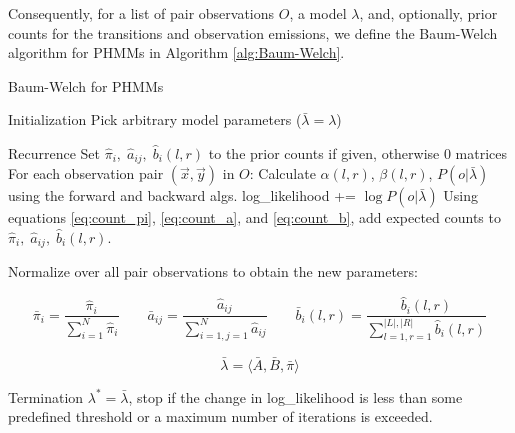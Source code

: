 \documentclass[a4paper,10pt]{article}
\begin{document}
Consequently, for a list of pair observations $O$, a model $\lambda$, and,
optionally, prior counts for the transitions and observation emissions, we
define the Baum-Welch algorithm for PHMMs in Algorithm \ref{alg:Baum-Welch}.

\vspace{0.4cm}
\begin{algorithm}[H]
\caption{Baum-Welch for PHMMs}
  \DontPrintSemicolon
{}
\BlankLine
{}
\BlankLine

Initialization\;
\BlankLine
\Indp Pick arbitrary model parameters ($\bar \lambda = \lambda$)\;
\BlankLine

\Indm Recurrence\;\Indp
\BlankLine
Set $\hat \pi_i,\; \hat a_{ij},\; \hat b_i(l, r)$ to the prior counts if given,
otherwise 0 matrices\;
For each observation pair $(\vec{x}, \vec{y})$ in $O$:\;\Indp
Calculate $\alpha(l,r)$, $\beta(l,r)$, $P(o | \bar\lambda)$ using the forward
and backward algs.\;
log\_likelihood += $\log P(o | \bar \lambda)$\;
Using equations \ref{eq:count_pi}, \ref{eq:count_a}, and \ref{eq:count_b}, add
expected counts to $\hat \pi_i,\; \hat a_{ij},\; \hat b_i(l, r)$.

\BlankLine
\Indm Normalize over all pair observations to obtain the new parameters:

$$\bar \pi_i = \frac{\hat \pi_i}{\displaystyle\sum_{i=1}^N \hat \pi_i} \qquad
\bar a_{ij} = \frac{\hat a_{ij}}{\displaystyle\sum_{i=1, j=1}^N \hat a_{ij}}
\qquad \bar b_i(l,r) = \frac{\hat b_i(l,r)}{\displaystyle\sum_{l=1, r=1}^{|L|, |R|}
  \hat b_i(l,r)}$$

$$\bar \lambda = \langle \bar A, \bar B, \bar \pi \rangle$$

\Indm Termination\;\Indp
\BlankLine
$\lambda^* = \bar\lambda$, stop if the change in log\_likelihood is less than some predefined threshold or a maximum number of iterations is
exceeded.
\BlankLine
\label{alg:Baum-Welch}
\end{algorithm}


\nocite{Rabiner:HMMs}




{\small

}
\end{document}
